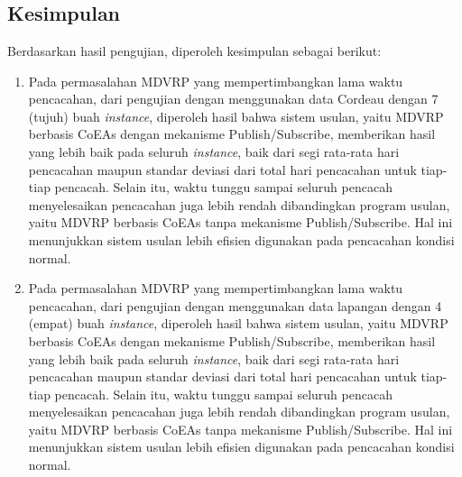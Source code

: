 \chapter{\kesimpulan}


\section{Kesimpulan}
Berdasarkan hasil pengujian, diperoleh kesimpulan sebagai berikut:

\begin{enumerate}
	\item Pada permasalahan MDVRP yang mempertimbangkan lama waktu pencacahan, dari pengujian dengan menggunakan data Cordeau dengan 7 (tujuh) buah \textit{instance}, diperoleh hasil bahwa sistem usulan, yaitu MDVRP berbasis CoEAs dengan mekanisme Publish/Subscribe, memberikan hasil yang lebih baik pada seluruh \textit{instance}, baik dari segi rata-rata hari pencacahan maupun standar deviasi dari total hari pencacahan untuk tiap-tiap pencacah. Selain itu, waktu tunggu sampai seluruh pencacah menyelesaikan pencacahan juga lebih rendah dibandingkan program usulan, yaitu MDVRP berbasis CoEAs tanpa mekanisme Publish/Subscribe. Hal ini menunjukkan sistem usulan lebih efisien digunakan pada pencacahan kondisi normal.
	
	\item Pada permasalahan MDVRP yang mempertimbangkan lama waktu pencacahan, dari pengujian dengan menggunakan data lapangan dengan 4 (empat) buah \textit{instance}, diperoleh hasil bahwa sistem usulan, yaitu MDVRP berbasis CoEAs dengan mekanisme Publish/Subscribe, memberikan hasil yang lebih baik pada seluruh \textit{instance}, baik dari segi rata-rata hari pencacahan maupun standar deviasi dari total hari pencacahan untuk tiap-tiap pencacah. Selain itu, waktu tunggu sampai seluruh pencacah menyelesaikan pencacahan juga lebih rendah dibandingkan program usulan, yaitu MDVRP berbasis CoEAs tanpa mekanisme Publish/Subscribe. Hal ini menunjukkan sistem usulan lebih efisien digunakan pada pencacahan kondisi normal.
	

\end{enumerate}
